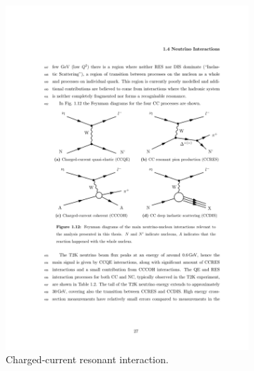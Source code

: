 \begin{description}
\begin{figure}[htbp]
  \begin{subfigure}{0.48\textwidth}
    \begin{center}
    \includegraphics[width=\linewidth]{figures/ccres_feyn.pdf}
    \caption{Charged-current resonant interaction.}
    \label{fig:ccres_feyn}
    \end{center}
  \end{subfigure}\hfill
  \begin{subfigure}{0.48\textwidth}
    \begin{center}

\end{center}
\end{subfigure}
\end{figure}
\end{description}
